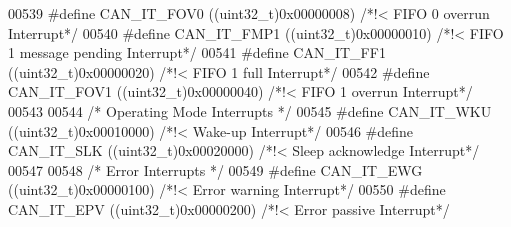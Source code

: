 \begin{DoxyCode}
00539 \textcolor{preprocessor}{#}\textcolor{preprocessor}{define} \textcolor{preprocessor}{CAN\_IT\_FOV0}                 \textcolor{preprocessor}{(}\textcolor{preprocessor}{(}\textcolor{preprocessor}{uint32\_t}\textcolor{preprocessor}{)}0x00000008\textcolor{preprocessor}{)} \textcolor{comment}{/*!< FIFO 0 overrun Interrupt*/}
00540 \textcolor{preprocessor}{#}\textcolor{preprocessor}{define} \textcolor{preprocessor}{CAN\_IT\_FMP1}                 \textcolor{preprocessor}{(}\textcolor{preprocessor}{(}\textcolor{preprocessor}{uint32\_t}\textcolor{preprocessor}{)}0x00000010\textcolor{preprocessor}{)} \textcolor{comment}{/*!< FIFO 1 message pending Interrupt*/}
00541 \textcolor{preprocessor}{#}\textcolor{preprocessor}{define} \textcolor{preprocessor}{CAN\_IT\_FF1}                  \textcolor{preprocessor}{(}\textcolor{preprocessor}{(}\textcolor{preprocessor}{uint32\_t}\textcolor{preprocessor}{)}0x00000020\textcolor{preprocessor}{)} \textcolor{comment}{/*!< FIFO 1 full Interrupt*/}
00542 \textcolor{preprocessor}{#}\textcolor{preprocessor}{define} \textcolor{preprocessor}{CAN\_IT\_FOV1}                 \textcolor{preprocessor}{(}\textcolor{preprocessor}{(}\textcolor{preprocessor}{uint32\_t}\textcolor{preprocessor}{)}0x00000040\textcolor{preprocessor}{)} \textcolor{comment}{/*!< FIFO 1 overrun Interrupt*/}
00543 
00544 \textcolor{comment}{/* Operating Mode Interrupts */}
00545 \textcolor{preprocessor}{#}\textcolor{preprocessor}{define} \textcolor{preprocessor}{CAN\_IT\_WKU}                  \textcolor{preprocessor}{(}\textcolor{preprocessor}{(}\textcolor{preprocessor}{uint32\_t}\textcolor{preprocessor}{)}0x00010000\textcolor{preprocessor}{)} \textcolor{comment}{/*!< Wake-up Interrupt*/}
00546 \textcolor{preprocessor}{#}\textcolor{preprocessor}{define} \textcolor{preprocessor}{CAN\_IT\_SLK}                  \textcolor{preprocessor}{(}\textcolor{preprocessor}{(}\textcolor{preprocessor}{uint32\_t}\textcolor{preprocessor}{)}0x00020000\textcolor{preprocessor}{)} \textcolor{comment}{/*!< Sleep acknowledge Interrupt*/}
00547 
00548 \textcolor{comment}{/* Error Interrupts */}
00549 \textcolor{preprocessor}{#}\textcolor{preprocessor}{define} \textcolor{preprocessor}{CAN\_IT\_EWG}                  \textcolor{preprocessor}{(}\textcolor{preprocessor}{(}\textcolor{preprocessor}{uint32\_t}\textcolor{preprocessor}{)}0x00000100\textcolor{preprocessor}{)} \textcolor{comment}{/*!< Error warning Interrupt*/}
00550 \textcolor{preprocessor}{#}\textcolor{preprocessor}{define} \textcolor{preprocessor}{CAN\_IT\_EPV}                  \textcolor{preprocessor}{(}\textcolor{preprocessor}{(}\textcolor{preprocessor}{uint32\_t}\textcolor{preprocessor}{)}0x00000200\textcolor{preprocessor}{)} \textcolor{comment}{/*!< Error passive Interrupt*/}

\end{DoxyCode}
